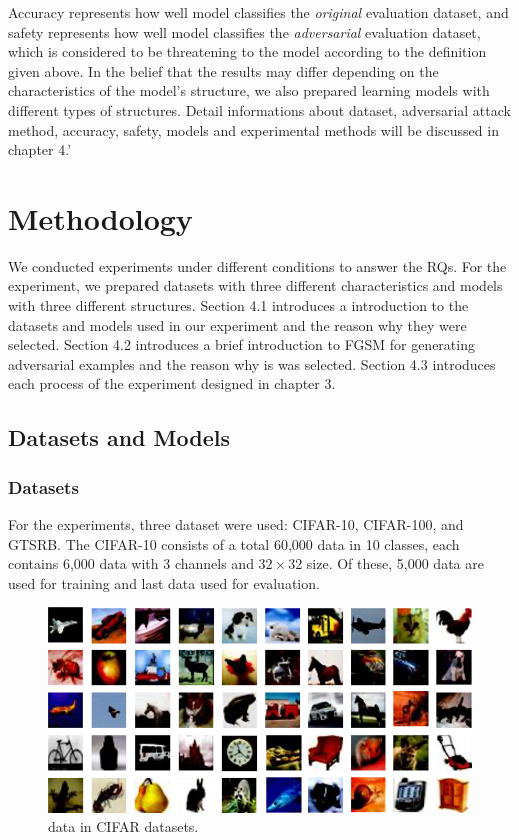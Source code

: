 \documentclass[journal,article,submit,moreauthors,pdftex]{Definitions/mdpi}
\begin{document}
Accuracy represents how well model classifies the {\it original} evaluation dataset, and safety represents how well model classifies the {\it adversarial} evaluation dataset, which is considered to be threatening to the model according to the definition given above.
In the belief that the results may differ depending on the characteristics of the model's structure, we also prepared learning models with different types of structures. 
Detail informations about dataset, adversarial attack method, accuracy, safety, models and experimental methods will be discussed in chapter 4.'

\section{Methodology}

We conducted experiments under different conditions to answer the RQs. For the experiment, we prepared datasets with three different characteristics and models with three different structures.
Section 4.1 introduces a introduction to the datasets and models used in our experiment and the reason why they were selected.
Section 4.2 introduces a brief introduction to FGSM for generating adversarial examples and the reason why is was selected.
Section 4.3 introduces each process of the experiment designed in chapter 3.

\subsection{Datasets and Models}

\subsubsection{Datasets}

For the experiments, three dataset were used: CIFAR-10, CIFAR-100, and GTSRB.
The CIFAR-10 consists of a total 60,000 data in 10 classes, each contains 6,000 data with 3 channels and \begin{math}{32\times 32}\end{math} size.
Of these, 5,000 data are used for training and last data used for evaluation.

\begin{figure}[H] 
\includegraphics[width=13cm]{Definitions/cifar-datasets.png}
\caption{data in CIFAR datasets.\label{cifar-datasets}}
\end{figure} 
\end{document}
